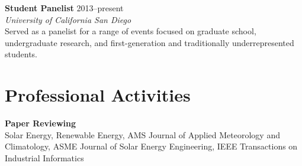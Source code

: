 \documentclass[]{res}
\begin{document}
\begin{resume}
\textbf{Student Panelist} \hfill 2013--present \\
\textit{University of California San Diego} \\
Served as a panelist for a range of events focused on graduate school,
undergraduate research, and first-generation and traditionally underrepresented
students.


\section{Professional Activities}
\vspace{0.1in}

\textbf{Paper Reviewing} \\
Solar Energy, Renewable Energy, AMS Journal of Applied Meteorology and
Climatology, ASME Journal of Solar Energy Engineering, IEEE Transactions on
Industrial Informatics


%
%
%
%
%



\end{resume}
\end{document}
